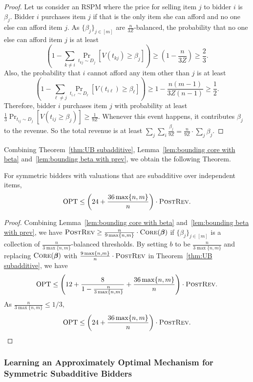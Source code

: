 \begin{proof}
	Let us consider an RSPM where the price for selling item $j$ to bidder $i$ is $\beta_j$. Bidder $i$ purchases item $j$ if that is the only item she can afford and no one else can afford item $j$. As $\{\beta_j\}_{j\in[m]}$ are $\frac{n}{3Z}$-balanced, the probability that no one else can afford item $j$ is at least $$\left(1-\sum_{k\neq i}\Pr_{t_{kj}\sim D_j}[V(t_{kj})\geq \beta_j]\right)\geq (1-\frac{n}{3Z})\geq \frac{2}{3}.$$ Also, the probability that $i$ cannot afford any item other than $j$ is at least $$\left(1-\sum_{\ell\neq j}\Pr_{t_{i\ell}\sim D_\ell}[V(t_{i\ell})\geq \beta_\ell]\right)\geq 1-\frac{n(m-1)}{3Z(n-1)}\geq\frac{1}{2}.$$ Therefore, bidder $i$ purchases item $j$ with probability at least $\frac{1}{3}\Pr_{t_{ij}\sim D_j}[V(t_{ij}\geq \beta_j)]\geq \frac{1}{9Z}$. Whenever this event happens, it contributes $\beta_j$ to the revenue. So the total revenue is at least $\sum_j\sum_i\frac{\beta_j}{9Z}= \frac{n}{9Z}\cdot \sum_j \beta_j$.
\end{proof}

Combining Theorem~\ref{thm:UB subadditive}, Lemma~\ref{lem:bounding core with beta} and~\ref{lem:bounding beta with prev}, we obtain the following Theorem.

\begin{theorem}\label{thm:subbadditive UB RSPM}
	For symmetric bidders with valuations that are subadditive over independent items, $$\text{OPT}\leq \left(24+\frac{36 \max\{n,m\}}{n}\right)\cdot \textsc{PostRev}.$$ \end{theorem}
\begin{proof}
	Combining Lemma~\ref{lem:bounding core with beta} and~\ref{lem:bounding beta with prev}, we have $\textsc{PostRev}\geq \frac{n}{9\max\{n,m\}}\cdot \textsc{Core}(\boldsymbol{\beta})$ if $\{\beta_j\}_{j\in[m]}$ is a collection of $\frac{n}{3\max\{n,m\}}$-balanced thresholds. By setting $b$ to be $\frac{n}{3\max\{n,m\}}$ and replacing $\textsc{Core}(\boldsymbol{\beta})$ with $\frac{9\max\{n,m\}}{n}\cdot \textsc{PostRev}$ in Theorem~\ref{thm:UB subadditive}, we have $$\text{OPT}\leq \left(12+\frac{8}{1-\frac{n}{3\max\{n,m\}}}+\frac{36 \max\{n,m\}}{n}\right)\cdot \textsc{PostRev}.$$ As $\frac{n}{3\max\{n,m\}}\leq 1/3$, $$\text{OPT}\leq \left(24+\frac{36 \max\{n,m\}}{n}\right)\cdot \textsc{PostRev}.$$
\end{proof}


\subsubsection{Learning an Approximately Optimal Mechanism for Symmetric Subadditive Bidders}

